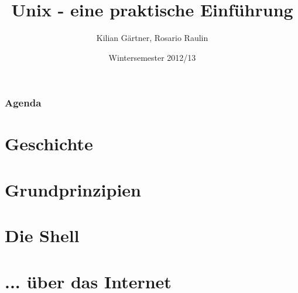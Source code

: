 \documentclass[12pt]{beamer}
\title{Unix - eine praktische Einführung}
\author{Kilian Gärtner, Rosario Raulin}
\date{Wintersemester 2012/13}
\begin{document}
\frame{\titlepage}

\begin{frame}
	\frametitle{Agenda}
	\tableofcontents
\end{frame}

\section{Geschichte}
\section{Grundprinzipien}
\section{Die Shell}
\section{... über das Internet}

\begin{frame}
\end{frame}
\end{document}
